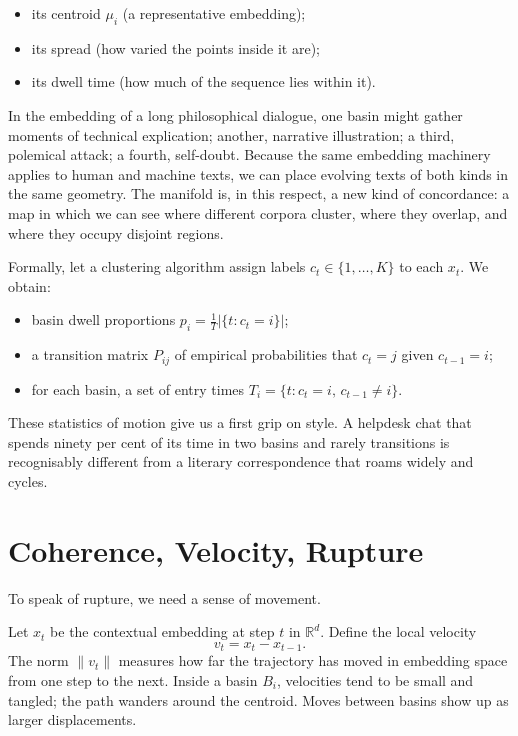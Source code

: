 \documentclass[12pt,a4paper]{article}
\begin{document}
\begin{itemize}
  \item its centroid $\mu_i$ (a representative embedding);
  \item its spread (how varied the points inside it are);
  \item its dwell time (how much of the sequence lies within it).
\end{itemize}

In the embedding of a long philosophical dialogue, one basin might gather moments of technical explication; another, narrative illustration; a third, polemical attack; a fourth, self-doubt. Because the same embedding machinery applies to human and machine texts, we can place evolving texts of both kinds in the same geometry. The manifold is, in this respect, a new kind of concordance: a map in which we can see where different corpora cluster, where they overlap, and where they occupy disjoint regions.

Formally, let a clustering algorithm assign labels $c_t \in \{1, \ldots, K\}$ to each $x_t$.
We obtain:

\begin{itemize}
  \item basin dwell proportions $p_i = \frac{1}{T} |\{t : c_t = i\}|$;
  \item a transition matrix $P_{ij}$ of empirical probabilities that $c_t = j$ given $c_{t-1} = i$;
  \item for each basin, a set of entry times $T_i = \{t : c_t = i,\, c_{t-1} \neq i\}$.
\end{itemize}

These statistics of motion give us a first grip on style. A helpdesk chat that spends ninety per cent of its time in two basins and rarely transitions is recognisably different from a literary correspondence that roams widely and cycles.


\section{Coherence, Velocity, Rupture}

To speak of rupture, we need a sense of movement.

Let $x_t$ be the contextual embedding at step $t$ in $\mathbb{R}^d$. Define the local velocity
\[
v_t = x_t - x_{t-1}.
\]
The norm $\|v_t\|$ measures how far the trajectory has moved in embedding space from one step to the next. Inside a basin $B_i$, velocities tend to be small and tangled; the path wanders around the centroid. Moves between basins show up as larger displacements.
\end{document}

